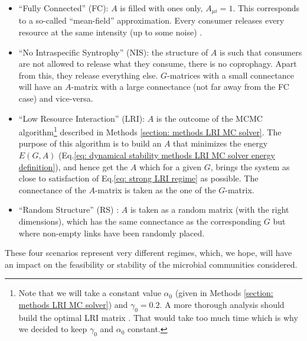 \documentclass[12pt]{report}
\begin{document}
\begin{itemize}
  \item ``Fully Connected'' (FC): $A$ is filled with ones only, $A_{\mu i}=1$. This corresponds to a so-called ``mean-field'' approximation. Every consumer releases every resource at the same intensity (up to some noise) .
  \item ``No Intraspecific Syntrophy'' (NIS): the structure of $A$ is such that consumers are not allowed to release what they consume, \ie there is no coprophagy. Apart from this, they release everything else. $G$-matrices with a small connectance will have an $A$-matrix with a large connectance (not far away from the FC case) and vice-versa.
  \item ``Low Resource Interaction'' (LRI): $A$ is the outcome of the MCMC algorithm\footnote{Note that we will take a constant value $\alpha_0$ (given in Methods \ref{section: methods LRI MC solver}) and $\gamma_0=0.2$. A more thorough analysis should build the optimal LRI matrix . That would take too much time which is why we decided to keep $\gamma_0$ and $\alpha_0$ constant.}
 described in Methods \ref{section: methods LRI MC solver}. The purpose of this algorithm is to build an $A$ that minimizes the energy $E(G,A)$ (Eq.\ref{eq: dynamical stability methods LRI MC solver energy definition}), and hence get the $A$ which for a given $G$, brings the system as close to satisfaction of Eq.\eqref{eq: strong LRI regime} as possible. The connectance of the $A$-matrix is taken as the one of the $G$-matrix.
 \item ``Random Structure'' (RS) : $A$ is taken as a random matrix (with the right dimensions), which has the same connectance as the corresponding $G$ but where non-empty links have been randomly placed.
 \end{itemize}
These four scenarios represent very different regimes, which, we hope, will have an impact on the feasibility or stability of the microbial communities considered.
\end{document}
